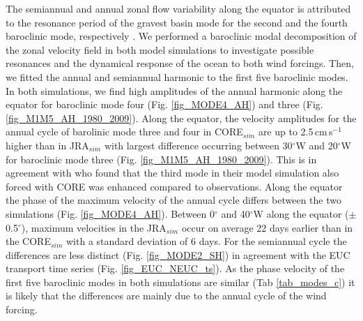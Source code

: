 \documentclass[os, manuscript]{copernicus}
\begin{document}
The semiannual and annual zonal flow variability along the equator is attributed to the resonance period of the gravest basin mode for the second and the fourth baroclinic mode, respectively \citep{Brandt2016}. We performed a baroclinic modal decomposition of the zonal velocity field in both model simulations to investigate possible resonances and the dynamical response of the ocean to both wind forcings. Then, we fitted the annual and semiannual harmonic to the first five baroclinic modes. In both simulations, we find high amplitudes of the annual harmonic along the equator for baroclinic mode four (Fig. \ref{fig_MODE4_AH}) and three (Fig. \ref{fig_M1M5_AH_1980_2009}). Along the equator, the velocity amplitudes for the annual cycle of barolinic mode three and four in CORE$_{sim}$ are up to 2.5$\,$cm$\,$s$^{-1}$ higher than in JRA$_{sim}$ with largest difference occurring between 30$^{\circ}$W and 20$^{\circ}$W for baroclinic mode three (Fig. \ref{fig_M1M5_AH_1980_2009}). This is in agreement with \cite{Brandt2016} who found that the third mode in their model simulation also forced with CORE was enhanced compared to observations. 
Along the equator the phase of the maximum velocity of the annual cycle differs between the two simulations (Fig. \ref{fig_MODE4_AH}). Between 0$^{\circ}$ and 40$^{\circ}$W along the equator ($ \pm $0.5$^{\circ}$), maximum velocities in the JRA$_{sim}$ occur on average 22 days earlier than in the CORE$_{sim}$ with a standard deviation of 6 days. For the semiannual cycle the differences are less distinct (Fig. \ref{fig_MODE2_SH}) in agreement with the EUC transport time series (Fig. \ref{fig_EUC_NEUC_ts}). As the phase velocity of the first five baroclinic modes in both simulations are similar (Tab \ref{tab_modes_c}) it is likely that the differences are mainly due to the annual cycle of the wind forcing.
\end{document}
